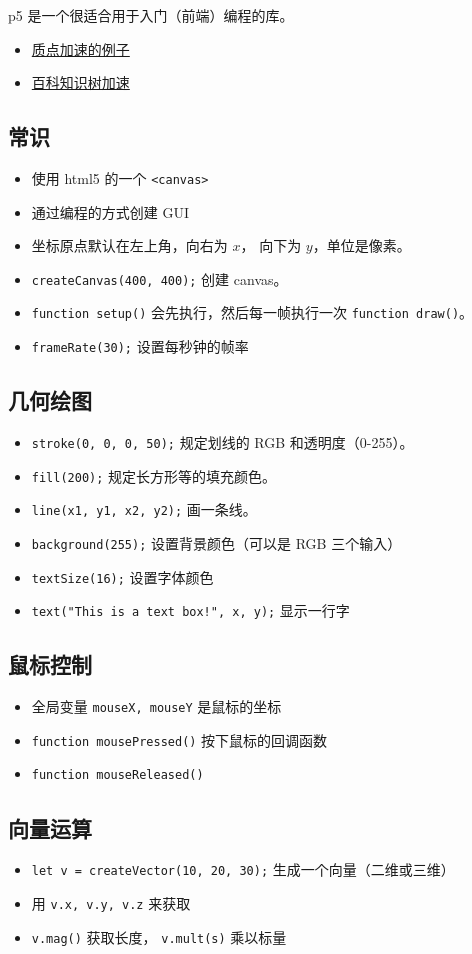 

p5 是一个很适合用于入门（前端）编程的库。

\begin{itemize}
\item \href{https://wuli.wiki/apps/PtAcc/}{质点加速的例子}
\item \href{https://wuli.wiki/apps/TwoBallSpring/}{百科知识树加速}
\end{itemize}

\subsection{常识}
\begin{itemize}
\item 使用 html5 的一个 \verb`<canvas>`
\item 通过编程的方式创建 GUI
\item 坐标原点默认在左上角，向右为 $x$， 向下为 $y$，单位是像素。
\item \verb`createCanvas(400, 400);` 创建 canvas。
\item \verb`function setup()` 会先执行，然后每一帧执行一次 \verb`function draw()`。
\item \verb`frameRate(30);` 设置每秒钟的帧率
\end{itemize}

\subsection{几何绘图}
\begin{itemize}
\item \verb`stroke(0, 0, 0, 50);` 规定划线的 RGB 和透明度（0-255）。
\item \verb`fill(200);` 规定长方形等的填充颜色。
\item \verb`line(x1, y1, x2, y2);` 画一条线。
\item \verb`background(255);` 设置背景颜色（可以是 RGB 三个输入）
\item \verb`textSize(16);` 设置字体颜色
\item \verb`text("This is a text box!", x, y);` 显示一行字
\end{itemize}

\subsection{鼠标控制}
\begin{itemize}
\item 全局变量 \verb`mouseX, mouseY` 是鼠标的坐标
\item \verb`function mousePressed()` 按下鼠标的回调函数
\item \verb`function mouseReleased()`
\end{itemize}

\subsection{向量运算}
\begin{itemize}
\item \verb`let v = createVector(10, 20, 30);` 生成一个向量（二维或三维）
\item 用 \verb`v.x, v.y, v.z` 来获取
\item \verb`v.mag()` 获取长度， \verb`v.mult(s)` 乘以标量
\end{itemize}

